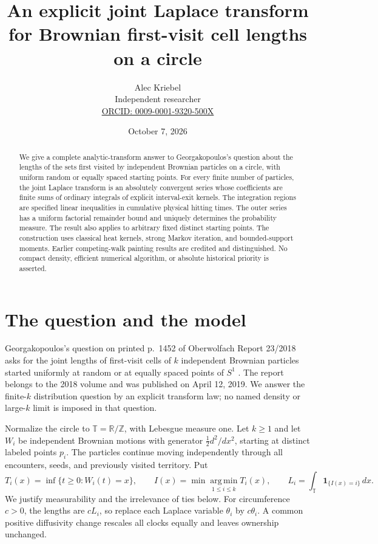 \documentclass[11pt]{article}
\title{An explicit joint Laplace transform\\for Brownian first-visit cell lengths on a circle}
\author{Alec Kriebel\\\small Independent researcher\\\small\href{https://orcid.org/0009-0001-9320-500X}{ORCID: 0009-0001-9320-500X}}
\date{October 7, 2026}
\newcommand{\T}{\mathbb T}
\newcommand{\R}{\mathbb R}
\newcommand{\ind}{\mathbf 1}
\begin{document}
\maketitle
\begin{abstract}
We give a complete analytic-transform answer to Georgakopoulos's
question about the lengths of the sets first visited by independent
Brownian particles on a circle, with uniform random or equally spaced
starting points. For every finite number of particles, the joint
Laplace transform is an absolutely convergent series whose coefficients
are finite sums of ordinary integrals of explicit interval-exit kernels.
The integration regions are specified linear inequalities in cumulative
physical hitting times. The outer series has a uniform factorial
remainder bound and uniquely determines the probability measure.
The result also applies to arbitrary fixed distinct starting points.
The construction uses classical heat kernels, strong Markov iteration,
and bounded-support moments. Earlier competing-walk painting results
are credited and distinguished. No compact density, efficient numerical
algorithm, or absolute historical priority is asserted.
\end{abstract}

\section{The question and the model}
Georgakopoulos's question on printed p.~1452 of Oberwolfach Report
23/2018 asks for the joint lengths of first-visit cells of $k$ independent
Brownian particles started uniformly at random or at equally spaced
points of $S^1$ \cite{Georgakopoulos}. The report belongs to the 2018
volume and was published on April 12, 2019. We answer the finite-$k$
distribution question by an explicit transform law; no named density or
large-$k$ limit is imposed in that question.

Normalize the circle to $\T=\R/\mathbb Z$, with Lebesgue measure one.
Let $k\geq1$ and let $W_i$ be independent Brownian motions with generator
$\tfrac12 d^2/dx^2$, starting at distinct labeled points $p_i$.
The particles continue moving independently through all encounters,
seeds, and previously visited territory. Put
\begin{equation}\label{lengths}
 T_i(x)=\inf\{t\geq0:W_i(t)=x\},\qquad
 I(x)=\min\operatorname*{arg\,min}_{1\leq i\leq k}T_i(x),\qquad
 L_i=\int_{\T}\ind_{\{I(x)=i\}}\,dx.
\end{equation}
We justify measurability and the irrelevance of ties below.
For circumference $c>0$, the lengths are $cL_i$, so replace each
Laplace variable $\theta_i$ by $c\theta_i$. A common positive diffusivity
change rescales all clocks equally and leaves ownership unchanged.
\end{document}
